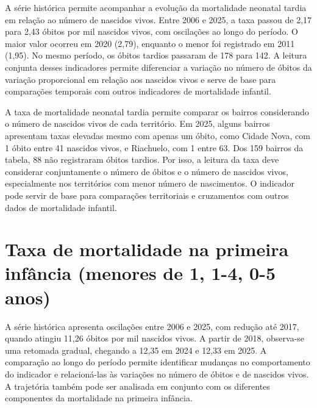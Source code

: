 A série histórica permite acompanhar a evolução da mortalidade neonatal tardia em relação ao número de nascidos vivos. Entre 2006 e 2025, a taxa passou de 2,17 para 2,43 óbitos por mil nascidos vivos, com oscilações ao longo do período. O maior valor ocorreu em 2020 (2,79), enquanto o menor foi registrado em 2011 (1,95). No mesmo período, os óbitos tardios passaram de 178 para 142. A leitura conjunta desses indicadores permite diferenciar a variação no número de óbitos da variação proporcional em relação aos nascidos vivos e serve de base para comparações temporais com outros indicadores de mortalidade infantil.


A taxa de mortalidade neonatal tardia permite comparar os bairros considerando o número de nascidos vivos de cada território. Em 2025, alguns bairros apresentam taxas elevadas mesmo com apenas um óbito, como Cidade Nova, com 1 óbito entre 41 nascidos vivos, e Riachuelo, com 1 entre 63. Dos 159 bairros da tabela, 88 não registraram óbitos tardios. Por isso, a leitura da taxa deve considerar conjuntamente o número de óbitos e o número de nascidos vivos, especialmente nos territórios com menor número de nascimentos. O indicador pode servir de base para comparações territoriais e cruzamentos com outros dados de mortalidade infantil.


\section{Taxa de mortalidade na primeira infância (menores de 1, 1-4, 0-5 anos)}


A série histórica apresenta oscilações entre 2006 e 2025, com redução até 2017, quando atingiu 11,26 óbitos por mil nascidos vivos. A partir de 2018, observa-se uma retomada gradual, chegando a 12,35 em 2024 e 12,33 em 2025. A comparação ao longo do período permite identificar mudanças no comportamento do indicador e relacioná-las às variações no número de óbitos e de nascidos vivos. A trajetória também pode ser analisada em conjunto com os diferentes componentes da mortalidade na primeira infância.

